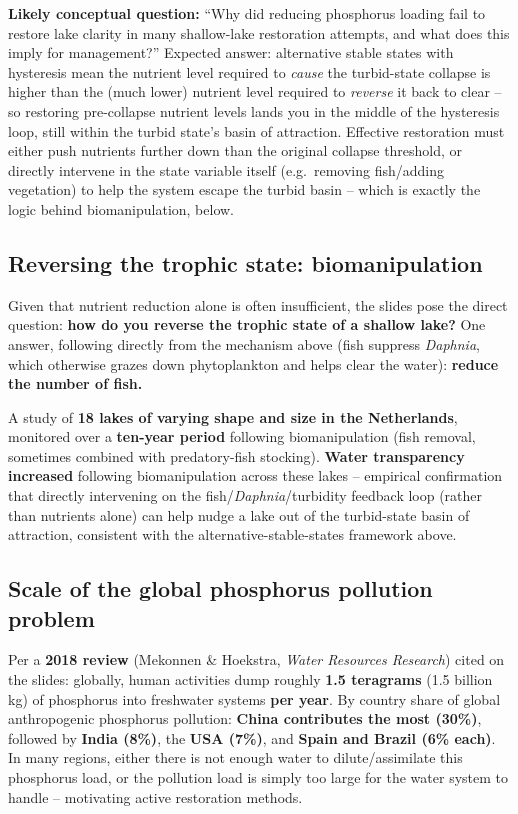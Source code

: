 \documentclass[11pt,a4paper]{article}
\begin{document}
\begin{exambox}
\textbf{Likely conceptual question:} ``Why did reducing phosphorus loading fail to restore lake clarity in many shallow-lake restoration attempts, and what does this imply for management?'' Expected answer: alternative stable states with hysteresis mean the nutrient level required to \emph{cause} the turbid-state collapse is higher than the (much lower) nutrient level required to \emph{reverse} it back to clear -- so restoring pre-collapse nutrient levels lands you in the middle of the hysteresis loop, still within the turbid state's basin of attraction. Effective restoration must either push nutrients further down than the original collapse threshold, or directly intervene in the state variable itself (e.g.\ removing fish/adding vegetation) to help the system escape the turbid basin -- which is exactly the logic behind biomanipulation, below.
\end{exambox}

\subsection{Reversing the trophic state: biomanipulation}
Given that nutrient reduction alone is often insufficient, the slides pose the direct question: \textbf{how do you reverse the trophic state of a shallow lake?} One answer, following directly from the mechanism above (fish suppress \textit{Daphnia}, which otherwise grazes down phytoplankton and helps clear the water): \textbf{reduce the number of fish.}

\begin{keybox}[title={Biomanipulation: Meijer et al.\ (1999)}]
A study of \textbf{18 lakes of varying shape and size in the Netherlands}, monitored over a \textbf{ten-year period} following biomanipulation (fish removal, sometimes combined with predatory-fish stocking). \textbf{Water transparency increased} following biomanipulation across these lakes -- empirical confirmation that directly intervening on the fish/\textit{Daphnia}/turbidity feedback loop (rather than nutrients alone) can help nudge a lake out of the turbid-state basin of attraction, consistent with the alternative-stable-states framework above.
\end{keybox}

\subsection{Scale of the global phosphorus pollution problem}
Per a \textbf{2018 review} (Mekonnen \& Hoekstra, \textit{Water Resources Research}) cited on the slides: globally, human activities dump roughly \textbf{1.5 teragrams} (1.5 billion kg) of phosphorus into freshwater systems \textbf{per year}. By country share of global anthropogenic phosphorus pollution: \textbf{China contributes the most (30\%)}, followed by \textbf{India (8\%)}, the \textbf{USA (7\%)}, and \textbf{Spain and Brazil (6\% each)}. In many regions, either there is not enough water to dilute/assimilate this phosphorus load, or the pollution load is simply too large for the water system to handle -- motivating active restoration methods.
\end{document}
